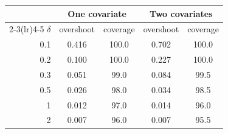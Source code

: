 \begin{tabular}{rcccc}
\toprule
& \multicolumn{2}{c}{One covariate} & \multicolumn{2}{c}{Two covariates} \\
\cmidrule(lr){2-3}\cmidrule(lr){4-5}
$\delta$ & overshoot & coverage & overshoot & coverage \\
\midrule
0.1 & 0.416 & 100.0 & 0.702 & 100.0 \\
0.2 & 0.100 & 100.0 & 0.227 & 100.0 \\
0.3 & 0.051 & 99.0 & 0.084 & 99.5 \\
0.5 & 0.026 & 98.0 & 0.034 & 98.5 \\
1 & 0.012 & 97.0 & 0.014 & 96.0 \\
2 & 0.007 & 96.0 & 0.007 & 95.5 \\
\bottomrule
\end{tabular}
